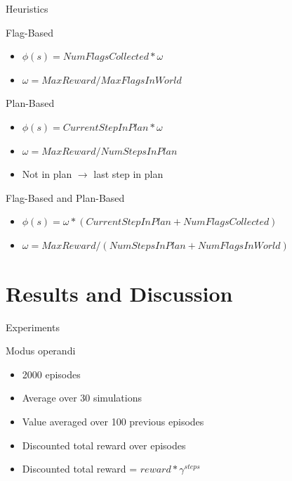 \documentclass{bredelebeamer}
\begin{document}
\begin{frame}{Heuristics}

\begin{block}{Flag-Based}
\begin{itemize}
\item $\phi (s) =  NumFlagsCollected*\omega$
\item $\omega = MaxReward/MaxFlagsInWorld$
\end{itemize}
\end{block}

\begin{block}{Plan-Based}
\begin{itemize}
\item $\phi (s) =  CurrentStepInPlan*\omega$
\item $\omega = MaxReward/NumStepsInPlan$
\item Not in plan $\rightarrow$ last step in plan
\end{itemize}
\end{block}

\begin{block}{Flag-Based and Plan-Based}
\begin{itemize}
\item $\phi (s) = \omega * (CurrentStepInPlan + NumFlagsCollected)$
\item $\omega = MaxReward/(NumStepsInPlan + NumFlagsInWorld)$
\end{itemize}
\end{block}

\end{frame}


\section{Results and Discussion}

\begin{frame}{Experiments}

\begin{block}{Modus operandi}
\begin{itemize}
\item 2000 episodes
\item Average over 30 simulations
\item Value averaged over 100 previous episodes
\item Discounted total reward over episodes
\item Discounted total reward = $reward*\gamma^{steps}$
\end{itemize}
\end{block}

\end{frame}
\end{document}
